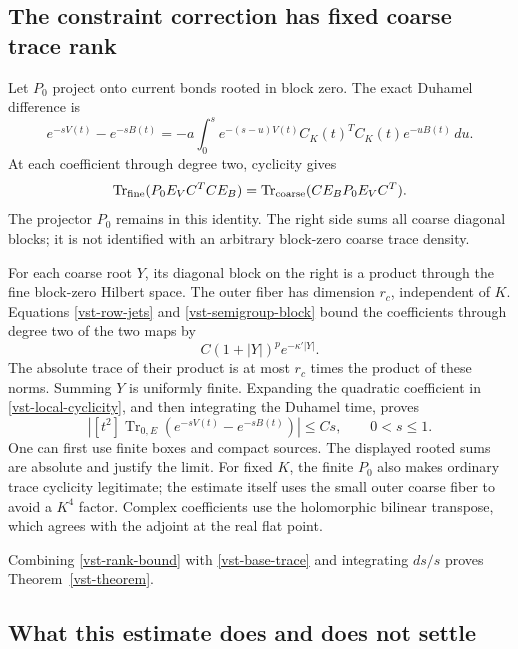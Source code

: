 \subsection{The constraint correction has fixed coarse trace rank}
\label{vst-rank-section}

Let \(P_0\) project onto current bonds rooted in block zero.
The exact Duhamel difference is
\begin{equation}
 e^{-sV(t)}-e^{-sB(t)}
   =-a\int_0^s e^{-(s-u)V(t)}
              C_K(t)^TC_K(t)e^{-uB(t)}\,du.
 \label{vst-difference}
\end{equation}
At each coefficient through degree two, cyclicity gives
\begin{equation}
 \operatorname{Tr}_{\rm fine}
           (P_0E_VC^TCE_B)
       =\operatorname{Tr}_{\rm coarse}
           (CE_BP_0E_VC^T).
 \label{vst-local-cyclicity}
\end{equation}
The projector \(P_0\) remains in this identity. The
right side sums all coarse diagonal blocks; it is
not identified with an arbitrary block-zero coarse
trace density.

For each coarse root \(Y\), its diagonal block on the
right is a product through the fine block-zero Hilbert
space. The outer fiber has dimension \(r_c\), independent
of \(K\). Equations \eqref{vst-row-jets} and
\eqref{vst-semigroup-block} bound the coefficients through
degree two of the two maps by
\[
                     C(1+|Y|)^p e^{-\kappa'|Y|}.
\]
The absolute trace of their product is at most \(r_c\)
times the product of these norms. Summing \(Y\) is
uniformly finite. Expanding the quadratic coefficient
in \eqref{vst-local-cyclicity}, and then integrating
the Duhamel time, proves
\begin{equation}
 \left|[t^2]\operatorname{Tr}_{0,E}
          (e^{-sV(t)}-e^{-sB(t)})\right|
                    \le Cs,\qquad 0<s\le1.
 \label{vst-rank-bound}
\end{equation}
One can first use finite boxes and compact sources.
The displayed rooted sums are absolute and justify
the limit. For fixed \(K\), the finite \(P_0\) also
makes ordinary trace cyclicity legitimate; the
estimate itself uses the small outer coarse fiber
to avoid a \(K^4\) factor. Complex coefficients use
the holomorphic bilinear transpose, which agrees
with the adjoint at the real flat point.

Combining \eqref{vst-rank-bound} with
\eqref{vst-base-trace} and integrating \(ds/s\)
proves Theorem~\ref{vst-theorem}.

\subsection{What this estimate does and does not settle}
\label{vst-scope}

